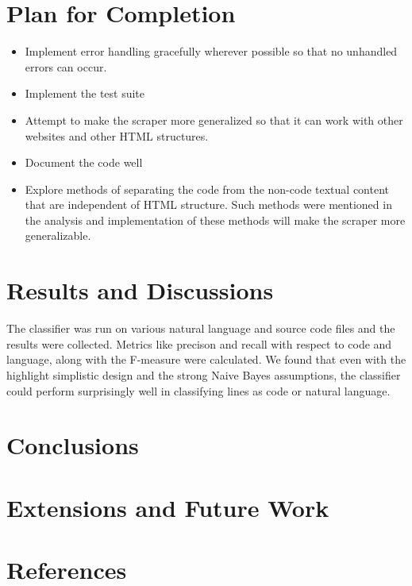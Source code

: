 \documentclass[12pt]{scrreprt}
\begin{document}
\chapter{Plan for Completion}


\begin{itemize}
    \item Implement error handling gracefully wherever possible so that no unhandled errors can occur.
    \item Implement the test suite
    \item Attempt to make the scraper more generalized so that it can work with other websites and other HTML structures.
    \item Document the code well
    \item Explore methods of separating the code from the non-code textual content that are independent of HTML structure. Such methods were mentioned in the analysis and implementation of these methods will make the scraper more generalizable. 
\end{itemize}


\chapter{Results and Discussions}

The classifier was run on various natural language and source code files and the results were collected. Metrics like precison and recall with respect to code and language, along with the F-measure were calculated. We found that even with the highlight simplistic design and the strong Naive Bayes assumptions, the classifier could perform surprisingly well in classifying lines as code or natural language.







\chapter{Conclusions}



\chapter{Extensions and Future Work}



\chapter{References}
\end{document}
